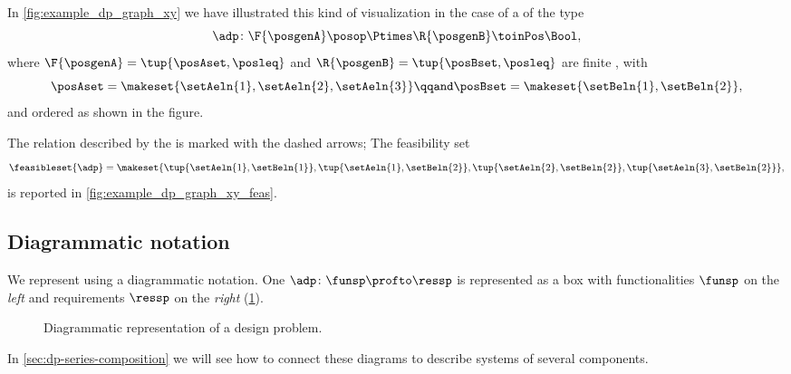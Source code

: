 \begin{example}
    \label{exa:visualize-dp}
    In \cref{fig:example_dp_graph_xy} we have illustrated this kind of visualization in the case of a  of the type
    \begin{equation}
        \adp \colon \F{\posgenA} \posop \Ptimes \R{\posgenB} \toinPos \Bool,
    \end{equation}
    where $\F{\posgenA} = \tup{\posAset, \posleq}$ and $ \R{\posgenB} = \tup{\posBset, \posleq}$ are finite , with
    \begin{equation}
        \posAset = \makeset{ \setAeln{1}, \setAeln{2}, \setAeln{3} }
        \qqand
        \posBset = \makeset{ \setBeln{1}, \setBeln{2}},
    \end{equation}
    and ordered as shown in the figure.

    The relation described by the  is marked with the dashed arrows;
    The feasibility set
    \begin{equation}
        \feasibleset{\adp} = \makeset{\tup{\setAeln{1}, \setBeln{1}}, \tup{\setAeln{1}, \setBeln{2}}, \tup{\setAeln{2}, \setBeln{2}}, \tup{\setAeln{3}, \setBeln{2}} },
    \end{equation}
    is reported in \cref{fig:example_dp_graph_xy_feas}.
\end{example}




\subsection{Diagrammatic notation}
\label{sec:dp-diagrammatic-notation}

We represent  using a diagrammatic notation.
One  $\adp \colon \funsp \profto \ressp$ is represented as a box with functionalities $\funsp$ on the \emph{left} and requirements $\ressp$ on the \emph{right} (\cref{fig:diagrammaticdp}).
\begin{figure}[h!]
    \centering
    \caption{Diagrammatic representation of a design problem. }
    \label{fig:diagrammaticdp}
\end{figure}

In \cref{sec:dp-series-composition} we will see how to connect these diagrams to describe systems of several components.



\begin{marginfigure}
    \centering
    \caption{Diagram of the engine design problem.}
    \label{fig:enginedp}
\end{marginfigure}

